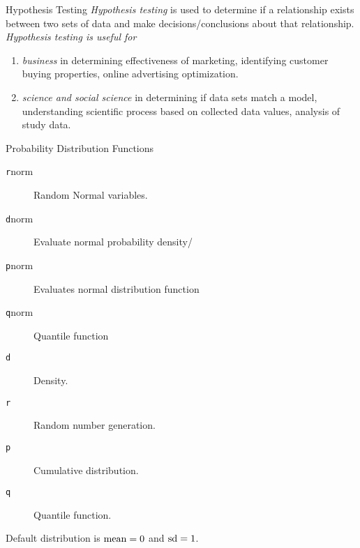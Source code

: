 \documentclass[xcolor=svgnames, 10pt, handout]{beamer}
\begin{document}
\begin{frame}[fragile]{Hypothesis Testing}
\emph{Hypothesis testing} is used to determine if a relationship exists between two sets of data and make decisions/conclusions about that relationship.
\vfill
\emph{Hypothesis testing is useful for}
\begin{enumerate}
\item \emph{business} in determining effectiveness of marketing, identifying customer buying properties, online advertising optimization.
\item \emph{science and social science} in determining if data sets match a model, understanding scientific process based on collected data values, analysis of study data.
\end{enumerate}
\vfill
\end{frame}


\begin{frame}[fragile]{Probability Distribution Functions}
\begin{description}
\item[\texttt rnorm] Random Normal variables.
\item[\texttt dnorm] Evaluate normal probability density/
\item[\texttt pnorm]  Evaluates normal distribution function 
\item[\texttt qnorm] Quantile function
\item[\texttt d] Density.
\item[\texttt r] Random number generation.
\item[\texttt p] Cumulative distribution.
\item[\texttt q] Quantile function.
\end{description}
Default distribution is ${\rm mean}=0$ and ${\rm sd}=1$.
\end{frame}
\end{document}
